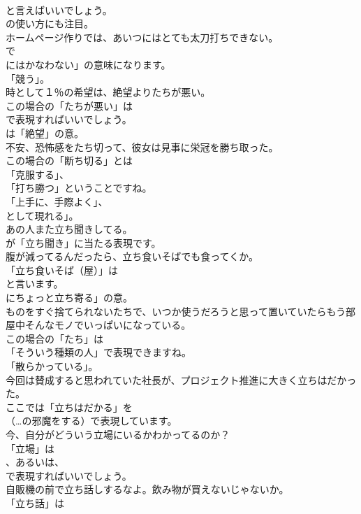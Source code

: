 \documentclass[8pt]{extreport}
\begin{document}
\begin{CJK}{UTF8}{min}
\\	と言えばいいでしょう。
\\	の使い方にも注目。	
\\	ホームページ作りでは、あいつにはとても太刀打ちできない。 
\\	で
\\	にはかなわない」の意味になります。
\\	「競う」。	
\\	時として１％の希望は、絶望よりたちが悪い。 
\\	この場合の「たちが悪い」は 
\\	で表現すればいいでしょう。
\\	は「絶望」の意。	
\\	不安、恐怖感をたち切って、彼女は見事に栄冠を勝ち取った。 
\\	この場合の「断ち切る」とは
\\	「克服する」、
\\	「打ち勝つ」ということですね。
\\	「上手に、手際よく」、
\\	として現れる」。	
\\	あの人また立ち聞きしてる。 
\\	が「立ち聞き」に当たる表現です。	
\\	腹が減ってるんだったら、立ち食いそばでも食ってくか。 
\\	「立ち食いそば（屋）」は
\\	と言います。
\\	にちょっと立ち寄る」の意。	
\\	ものをすぐ捨てられないたちで、いつか使うだろうと思って置いていたらもう部屋中そんなモノでいっぱいになっている。 
\\	この場合の「たち」は
\\	「そういう種類の人」で表現できますね。
\\	「散らかっている」。	
\\	今回は賛成すると思われていた社長が、プロジェクト推進に大きく立ちはだかった。 
\\	ここでは「立ちはだかる」を 
\\	（…の邪魔をする）で表現しています。	
\\	今、自分がどういう立場にいるかわかってるのか？ 
\\	「立場」は 
\\	、あるいは、
\\	で表現すればいいでしょう。	
\\	自販機の前で立ち話しするなよ。飲み物が買えないじゃないか。 
\\	「立ち話」は

\end{CJK}
\end{document}
